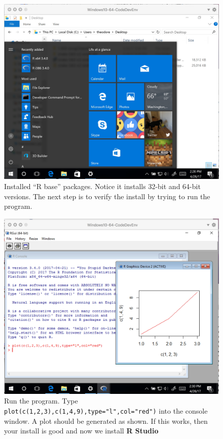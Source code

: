 \begin{figure}[h!] %
   \centering
   \includegraphics[width=4.5in]{./1-Introduction/baseR.jpg} 
   \caption{Installed ``R base'' packages.  Notice it installs 32-bit and 64-bit versions.  The next step is to verify the install by trying to run the program.}
\end{figure}

\begin{figure}[h!] %
   \centering
   \includegraphics[width=4.5in]{./1-Introduction/installerR.jpg} 
   \caption{Run the program.  Type \texttt{plot(c(1,2,3),c(1,4,9),type="l",col="red")} into the console window.  A plot should be generated as shown.  If this works, then your install is good and now we install \textbf{R Studio}}
\end{figure}

